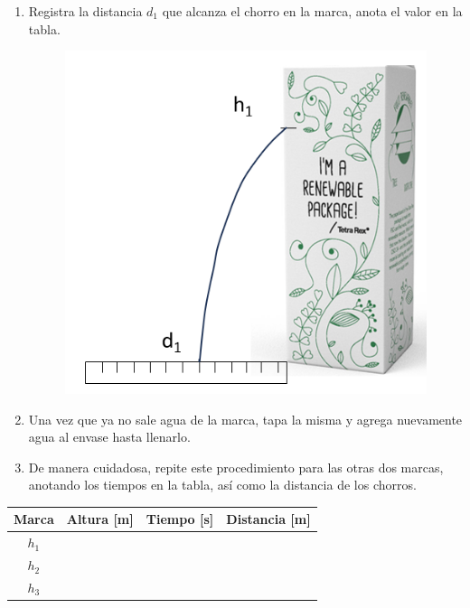 \documentclass[14pt]{extarticle}
\begin{document}
\begin{enumerate}
\item Registra la distancia $d_{1}$ que alcanza el chorro en la marca, anota el valor en la tabla.
\begin{figure}[H]
    \centering
    \includegraphics[scale=1]{Imagenes/Practica_04_Tetrapack_02.png}
\end{figure}
\item Una vez que ya no sale agua de la marca, tapa la misma y agrega nuevamente agua al envase hasta llenarlo.
\item De manera cuidadosa, repite este procedimiento para las otras dos marcas, anotando los tiempos en la tabla, así como la distancia de los chorros.
\end{enumerate}

\begin{table}[H]
    \centering
    \begin{tabular}{| c | c | c | c |} \hline
        Marca & Altura [\unit{\meter}] & Tiempo [\unit{\second}] & Distancia [\unit{\meter}] \\ \hline
        $h_{1}$ & & & \\ \hline
        $h_{2}$ & & & \\ \hline
        $h_{3}$ & & & \\ \hline
    \end{tabular}
\end{table}
\end{document}
